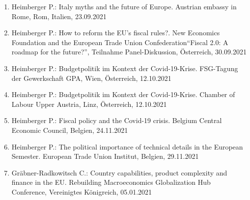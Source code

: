\begin{enumerate}
	\item Heimberger P.: Italy myths and the future of Europe. Austrian embassy in Rome, Rom, Italien, 23.09.2021
	\item Heimberger P.: How to reform the EU’s fiscal rules?. New Economics Foundation and the European Trade Union Confederation“Fiscal 2.0: A roadmap for the future?”, Teilnahme Panel-Diskussion, Österreich, 30.09.2021
	\item Heimberger P.: Budgetpolitik im Kontext der Covid-19-Krise. FSG-Tagung der Gewerkschaft GPA, Wien, Österreich, 12.10.2021
	\item Heimberger P.: Budgetpolitik im Kontext der Covid-19-Krise. Chamber of Labour Upper Austria, Linz, Österreich, 12.10.2021
	\item Heimberger P.: Fiscal policy and the Covid-19 crisis. Belgium Central Economic Council, Belgien, 24.11.2021
	\item Heimberger P.: The political importance of technical details in the European Semester. European Trade Union Institut, Belgien, 29.11.2021
	\item Gräbner-Radkowitsch C.: Country capabilities, product complexity and finance in the EU. Rebuilding Macroeconomics Globalization Hub Conference, Vereinigtes Königreich, 05.01.2021
\end{enumerate}

